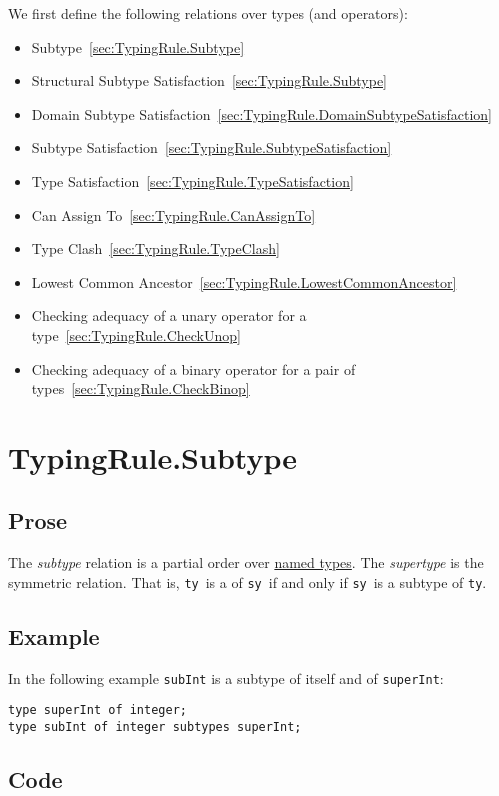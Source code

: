 \documentclass{book}
\newcommand\tty[0]{\texttt{ty}}
\newcommand\tsy[0]{\texttt{sy}}
\begin{document}
We first define the following relations over types (and operators):
\begin{itemize}
  \item Subtype~\ref{sec:TypingRule.Subtype}
  \item Structural Subtype Satisfaction~\ref{sec:TypingRule.Subtype}
  \item Domain Subtype Satisfaction~\ref{sec:TypingRule.DomainSubtypeSatisfaction}
  \item Subtype Satisfaction~\ref{sec:TypingRule.SubtypeSatisfaction}
  \item Type Satisfaction~\ref{sec:TypingRule.TypeSatisfaction}
  \item Can Assign To~\ref{sec:TypingRule.CanAssignTo}
  \item Type Clash~\ref{sec:TypingRule.TypeClash}
  \item Lowest Common Ancestor~\ref{sec:TypingRule.LowestCommonAncestor}
  \item Checking adequacy of a unary operator for a type~\ref{sec:TypingRule.CheckUnop}
  \item Checking adequacy of a binary operator for a pair of types~\ref{sec:TypingRule.CheckBinop}
\end{itemize}

\section{TypingRule.Subtype\label{sec:TypingRule.Subtype}}

  \subsection{Prose}
The \emph{subtype} relation is a partial order over \underline{named types}.
The \emph{supertype} is the symmetric relation. That is, \tty\ is a  of \tsy\ if and only if \tsy\ is a subtype of \tty.

  \subsection{Example}
In the following example \texttt{subInt} is a subtype of itself and of \texttt{superInt}:
\begin{verbatim}
type superInt of integer;
type subInt of integer subtypes superInt;
\end{verbatim}
 
  \subsection{Code}
\end{document}
